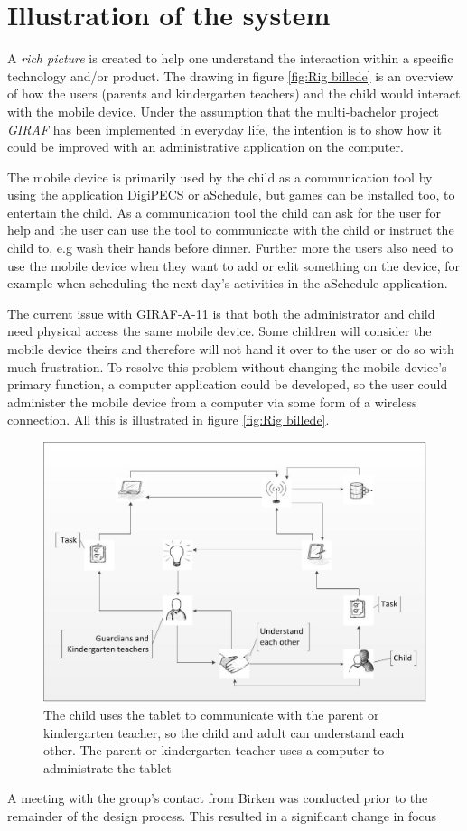 \section{Illustration of the system}
A \emph{rich picture} is created to help one understand the interaction within a specific technology and/or product\cite{OOAD}. The drawing in figure \vref{fig:Rig billede} is an overview of how the users (parents and kindergarten teachers) and the child would interact with the mobile device. Under the assumption that the multi-bachelor project \emph{GIRAF} has been implemented in everyday life, the intention is to show how it could be improved with an administrative application on the computer.

The mobile device is primarily used by the child as a communication tool by using the application DigiPECS or aSchedule, but games can be installed too, to entertain the child. As a communication tool the child can ask for the user for help and the user can use the tool to communicate with the child or instruct the child to, e.g wash their hands before dinner.
Further more the users also need to use the mobile device when they want to add or edit something on the device, for example when scheduling the next day's activities in the aSchedule application.
 
The current issue with GIRAF-A-11 is that both the administrator and child need physical access the same mobile device. Some children will consider the mobile device theirs and therefore will not hand it over to the user or do so with much frustration. To resolve this problem without changing the mobile device's primary function, a computer application could be developed, so the user could administer the mobile device from a computer via some form of a wireless connection. All this is illustrated in figure \vref{fig:Rig billede}. 

\begin{figure}[!ht]
	\centering
		\includegraphics[width=1.00\textwidth]{img/Rig_billede2.jpg}
	\caption{The child uses the tablet to communicate with the parent or kindergarten teacher, so the child and adult can understand each other. The parent or kindergarten teacher uses a computer to administrate the tablet}
	\label{fig:Rig billede}
\end{figure}
\newpage

A meeting with the group's contact from Birken was conducted prior to the remainder of the design process. This resulted in a significant change in focus
    